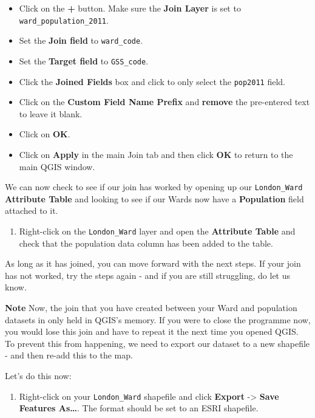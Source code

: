 \documentclass[
]{book}
\providecommand{\tightlist}{%
  \setlength{\itemsep}{0pt}\setlength{\parskip}{0pt}}
\begin{document}
\begin{itemize}
\tightlist
\item
  Click on the \textbf{+} button. Make sure the \textbf{Join Layer} is set to \texttt{ward\_population\_2011}.
\item
  Set the \textbf{Join field} to \texttt{ward\_code}.
\item
  Set the \textbf{Target field} to \texttt{GSS\_code}.
\item
  Click the \textbf{Joined Fields} box and click to only select the \texttt{pop2011} field.
\item
  Click on the \textbf{Custom Field Name Prefix} and \textbf{remove} the pre-entered text to leave it blank.
\item
  Click on \textbf{OK}.
\item
  Click on \textbf{Apply} in the main Join tab and then click \textbf{OK} to return to the main QGIS window.
\end{itemize}

We can now check to see if our join has worked by opening up our \texttt{London\_Ward} \textbf{Attribute Table} and looking to see if our Wards now have a \textbf{Population} field attached to it.

\begin{enumerate}
\def\labelenumi{\arabic{enumi}.}
\setcounter{enumi}{5}
\tightlist
\item
  Right-click on the \texttt{London\_Ward} layer and open the \textbf{Attribute Table} and check that the population data column has been added to the table.
\end{enumerate}

As long as it has joined, you can move forward with the next steps. If your join has not worked, try the steps again - and if you are still struggling, do let us know.

\textbf{Note}
Now, the join that you have created between your Ward and population datasets in only held in QGIS's memory. If you were to close the programme now, you would lose this join and have to repeat it the next time you opened QGIS. To prevent this from happening, we need to export our dataset to a new shapefile - and then re-add this to the map.

Let's do this now:

\begin{enumerate}
\def\labelenumi{\arabic{enumi}.}
\setcounter{enumi}{6}
\tightlist
\item
  Right-click on your \texttt{London\_Ward} shapefile and click \textbf{Export} -\textgreater{} \textbf{Save Features As\ldots{}}. The format should be set to an ESRI shapefile.
\end{enumerate}
\end{document}
